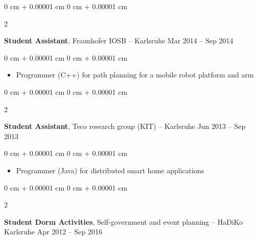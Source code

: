 \documentclass[10pt, letterpaper]{article}
\newenvironment{highlights}{
    \begin{itemize}[
        topsep=0.10 cm,
        parsep=0.10 cm,
        partopsep=0pt,
        itemsep=0pt,
        leftmargin=0 cm + 10pt
    ]
}{
    \end{itemize}
} %
\newenvironment{onecolentry}{
    \begin{adjustwidth}{
        0 cm + 0.00001 cm
    }{
        0 cm + 0.00001 cm
    }
}{
    \end{adjustwidth}
} %
\newenvironment{twocolentry}[2][]{
    \onecolentry
    \def\secondColumn{#2}
    \setcolumnwidth{\fill, 4.5 cm}
    \begin{paracol}{2}
}{
    \switchcolumn \raggedleft \secondColumn
    \end{paracol}
    \endonecolentry
} %
\begin{document}
        \expspace

        \begin{twocolentry}{
            Mar 2014 – Sep 2014
        }
            \textbf{Student Assistant}, Fraunhofer IOSB -- Karlsruhe\end{twocolentry}

        \vspace{0.10 cm}
        \begin{onecolentry}
            \begin{highlights}
                \item Programmer (C++) for path planning for a mobile robot platform and arm
            \end{highlights}
        \end{onecolentry}
        
        \expspace
        \begin{twocolentry}{
            Jun 2013 – Sep 2013
        }
            \textbf{Student Assistant}, Teco research group (KIT) -- Karlsruhe\end{twocolentry}

        \vspace{0.10 cm}
        \begin{onecolentry}
            \begin{highlights}
                \item Programmer (Java) for distributed smart home applications
            \end{highlights}
        \end{onecolentry}

        
        \expspace
        \begin{twocolentry}{
            Apr 2012 – Sep 2016
        }
            \textbf{Student Dorm Activities}, Self-government and event planning -- HaDiKo Karlsruhe\end{twocolentry}



    \sectionspace
\end{document}
